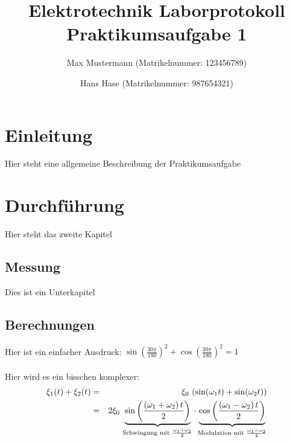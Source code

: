 \documentclass[a4paper, 11pt]{article}
\begin{document}
\title{Elektrotechnik Laborprotokoll\\Praktikumsaufgabe 1}

\author{Max Mustermann (Matrikelnummer: 123456789) \and 
        Hans Hase (Matrikelnummer: 987654321)}

\maketitle 
\newpage %

\tableofcontents
\newpage %

\section{Einleitung}
Hier steht eine allgemeine Beschreibung der Praktikumsaufgabe
\newpage

\section{Durchführung}
Hier steht das zweite Kapitel

\subsection{Messung}
Dies ist ein Unterkapitel
\newpage

\subsection{Berechnungen}

Hier ist ein einfacher Ausdruck: $\sin(\frac{30 \pi}{180})^{2} + \cos(\frac{30 \pi}{180})^{2} = 1$
\\
\\
Hier wird es ein bisschen komplexer: 
\begin{eqnarray}\nonumber
\xi_1(t) + \xi_2(t) &=& \xi_0\,\left(\sin(\omega_1 t)+\sin(\omega_2 t)\right) \\ \nonumber
    &=& 2\xi_0\, \underbrace{\sin\left(\frac{(\omega_1+\omega_2)\, t}{2}\right)}_{\mbox{\scriptsize Schwingung mit $\frac{\omega_1+\omega_2}{2}$}}\cdot \underbrace{\cos\left(\frac{(\omega_1-\omega_2)\, t}{2}\right)}_{\mbox{\scriptsize Modulation mit $\frac{\omega_1-\omega_2}{2}$}}
\end{eqnarray}
\end{document}
